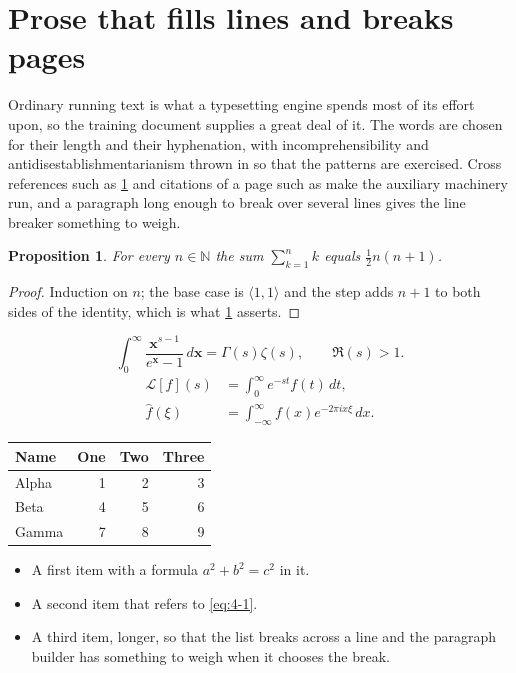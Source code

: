 \documentclass[11pt,a4paper]{report}
\theoremstyle{plain}
\newtheorem{proposition}{Proposition}[chapter]
\newcommand{\vecn}[1]{\mathbf{#1}}
\newcommand{\pairs}[2]{\langle #1,#2\rangle}
\begin{document}
\section{Prose that fills lines and breaks pages}
\label{sec:prose4-1}
Ordinary running text is what a typesetting engine spends most of its effort
upon, so the training document supplies a great deal of it. The words are
chosen for their length and their hyphenation, with incomprehensibility and
antidisestablishmentarianism thrown in so that the patterns are exercised.
Cross references such as \cref{sec:prose4-1} and citations of a page such
as \pageref{sec:prose4-1} make the auxiliary machinery run, and a
paragraph long enough to break over several lines gives the line breaker
something to weigh.
\begin{proposition}\label{prop:4-1}
For every $n\in\mathbb{N}$ the sum $\sum_{k=1}^{n}k$ equals
$\tfrac{1}{2}n(n+1)$.
\end{proposition}
\begin{proof}
Induction on $n$; the base case is $\pairs{1}{1}$ and the step adds $n+1$ to
both sides of the identity, which is what \cref{prop:4-1} asserts.
\end{proof}
\begin{equation}\label{eq:4-1}
  \int_{0}^{\infty}\frac{\vecn{x}^{s-1}}{e^{\vecn{x}}-1}\,d\vecn{x}
    = \Gamma(s)\zeta(s),\qquad \Re(s)>1 .
\end{equation}
\begin{align}
  \mathcal{L}[f](s) &= \int_{0}^{\infty} e^{-st} f(t)\,dt, \\
  \widehat{f}(\xi)  &= \int_{-\infty}^{\infty} f(x) e^{-2\pi i x\xi}\,dx .
\end{align}
\par\noindent\begin{center}
\begin{tabular}{lrrr}
\hline
Name & One & Two & Three \\
\hline
Alpha & 1 & 2 & 3 \\
Beta & 4 & 5 & 6 \\
Gamma & 7 & 8 & 9 \\
\hline
\end{tabular}
\end{center}
\begin{itemize}
  \item A first item with a formula $a^2+b^2=c^2$ in it.
  \item A second item that refers to \eqref{eq:4-1}.
  \item A third item, longer, so that the list breaks across a line and the
    paragraph builder has something to weigh when it chooses the break.
\end{itemize}
\end{document}
